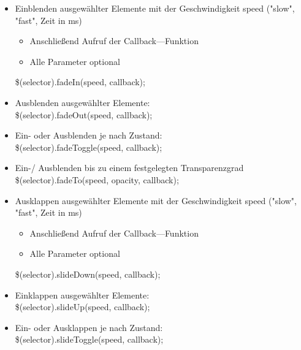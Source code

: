 \documentclass[10pt]{article}
\begin{document}
    \begin{tcolorbox}[
    colback=Red!5!white,
    colframe=Red!75!black,
    title={\centering Blenden (Fading)}]
    \begin{itemize}
        \item Einblenden ausgewählter Elemente mit der Geschwindigkeit speed ("slow", "fast", Zeit in ms)
        \begin{itemize}
            \item Anschließend Aufruf der Callback—Funktion
            \item Alle Parameter optional
        \end{itemize}
        \$(selector).fadeIn(speed, callback);
    \end{itemize}
    \begin{itemize}
        \item Ausblenden ausgewählter Elemente: \\ \$(selector).fadeOut(speed, callback);
    \end{itemize}
    \begin{itemize}
        \item Ein- oder Ausblenden je nach Zustand: \\ \$(selector).fadeToggle(speed, callback);
    \end{itemize}
    \begin{itemize}
        \item Ein-/ Ausblenden bis zu einem festgelegten Transparenzgrad \\ \$(selector).fadeTo(speed, opacity, callback);
    \end{itemize}
    \end{tcolorbox}

    \begin{tcolorbox}[
    colback=Red!5!white,
    colframe=Red!75!black,
    title={\centering Klappen (Sliding)}]
    \begin{itemize}
        \item Ausklappen ausgewählter Elemente mit der Geschwindigkeit speed ("slow", "fast", Zeit in ms)
        \begin{itemize}
            \item Anschließend Aufruf der Callback—Funktion
            \item Alle Parameter optional
        \end{itemize}
        \$(selector).slideDown(speed, callback);
    \end{itemize}
    \begin{itemize}
        \item Einklappen ausgewählter Elemente: \\ \$(selector).slideUp(speed, callback);
    \end{itemize}
    \begin{itemize}
        \item Ein- oder Ausklappen je nach Zustand: \\ \$(selector).slideToggle(speed, callback);
    \end{itemize}
    \end{tcolorbox}
\end{document}
